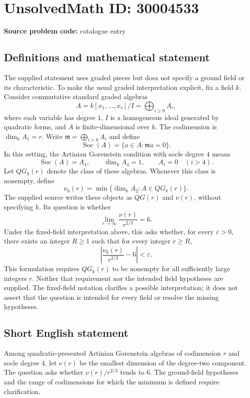 \documentclass[11pt]{article}
\begin{document}
\section*{UnsolvedMath ID: 30004533}
\textbf{Source problem code:} catalogue entry
\subsection{Definitions and mathematical statement}
The supplied statement uses graded pieces but does not specify a ground field or its characteristic. To make the usual graded interpretation explicit, fix a field \(k\). Consider commutative standard graded algebras
\[
A=k[x_1,\ldots,x_r]/I=\bigoplus_{i\geq 0}A_i,
\]
where each variable has degree \(1\), \(I\) is a homogeneous ideal generated by quadratic forms, and \(A\) is finite-dimensional over \(k\). The codimension is \(\dim_k A_1=r\). Write \(\mathfrak m=\bigoplus_{i>0}A_i\) and define
\[
\operatorname{Soc}(A)=\{a\in A:\mathfrak m a=0\}.
\]
In this setting, the Artinian Gorenstein condition with socle degree \(4\) means
\[
\operatorname{Soc}(A)=A_4,\qquad \dim_k A_4=1,\qquad A_i=0\quad(i>4).
\]
Let \(QG_k(r)\) denote the class of these algebras. Whenever this class is nonempty, define
\[
\nu_k(r)=\min\{\dim_k A_2:A\in QG_k(r)\}.
\]
The supplied source writes these objects as \(QG(r)\) and \(\nu(r)\), without specifying \(k\). Its question is whether
\[
\lim_{r\to\infty}\frac{\nu(r)}{r^{2/3}}=6.
\]
Under the fixed-field interpretation above, this asks whether, for every \(\varepsilon>0\), there exists an integer \(R\geq 1\) such that for every integer \(r\geq R\),
\[
\left|\frac{\nu_k(r)}{r^{2/3}}-6\right|<\varepsilon.
\]
This formulation requires \(QG_k(r)\) to be nonempty for all sufficiently large integers \(r\). Neither that requirement nor the intended field hypotheses are supplied. The fixed-field notation clarifies a possible interpretation; it does not assert that the question is intended for every field or resolve the missing hypotheses.
\subsection{Short English statement}
Among quadratic-presented Artinian Gorenstein algebras of codimension \(r\) and socle degree \(4\), let \(\nu(r)\) be the smallest dimension of the degree-two component. The question asks whether \(\nu(r)/r^{2/3}\) tends to \(6\). The ground-field hypotheses and the range of codimensions for which the minimum is defined require clarification.
\end{document}
